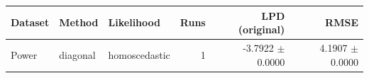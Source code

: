 \begin{tabular}{lllrrr}
\toprule
Dataset & Method & Likelihood & Runs & LPD (original) & RMSE \\
\midrule
Power & diagonal & homoscedastic & 1 & -3.7922 $\pm$ 0.0000 & 4.1907 $\pm$ 0.0000 \\
\bottomrule
\end{tabular}
